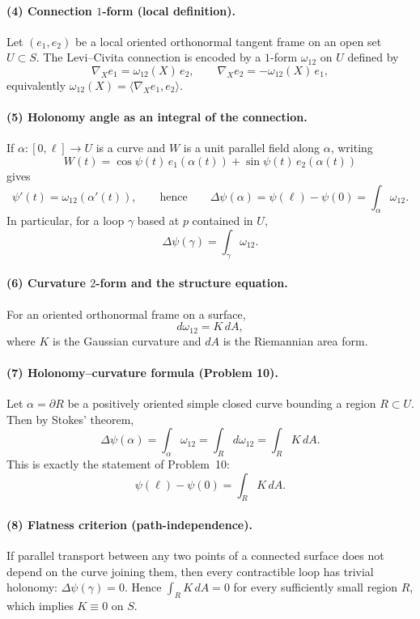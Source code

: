 \documentclass[12pt,a4paper]{article}
\theoremstyle{plain}
\theoremstyle{definition}      %
\begin{document}
	\paragraph{(4) Connection $1$-form (local definition).}
	Let $(e_1,e_2)$ be a local oriented orthonormal tangent frame on an open set $U\subset S$.
	The Levi--Civita connection is encoded by a $1$-form $\omega_{12}$ on $U$ defined by
	\[
	\nabla_X e_1=\omega_{12}(X)\,e_2,\qquad \nabla_X e_2=-\omega_{12}(X)\,e_1,
	\]
	equivalently $\omega_{12}(X)=\langle\nabla_X e_1,e_2\rangle$.
	
	\paragraph{(5) Holonomy angle as an integral of the connection.}
	If $\alpha:[0,\ell]\to U$ is a curve and $W$ is a unit parallel field along $\alpha$, writing
	\[
	W(t)=\cos\psi(t)\,e_1(\alpha(t))+\sin\psi(t)\,e_2(\alpha(t))
	\]
	gives
	\[
	\psi'(t)=\omega_{12}(\alpha'(t)),
	\qquad\text{hence}\qquad
	\Delta\psi(\alpha)=\psi(\ell)-\psi(0)=\int_\alpha \omega_{12}.
	\]
	In particular, for a loop $\gamma$ based at $p$ contained in $U$,
	\[
	\Delta\psi(\gamma)=\int_\gamma \omega_{12}.
	\]
	
	\paragraph{(6) Curvature $2$-form and the structure equation.}
	For an oriented orthonormal frame on a surface,
	\[
	d\omega_{12}=K\,dA,
	\]
	where $K$ is the Gaussian curvature and $dA$ is the Riemannian area form.
	
	\paragraph{(7) Holonomy--curvature formula (Problem 10).}
	Let $\alpha=\partial R$ be a positively oriented simple closed curve bounding a region $R\subset U$.
	Then by Stokes' theorem,
	\[
	\Delta\psi(\alpha)=\int_\alpha \omega_{12}
	=\int_R d\omega_{12}
	=\int_R K\,dA.
	\]
	This is exactly the statement of Problem~10:
	\[
	\psi(\ell)-\psi(0)=\int_R K\,dA.
	\]
	
	\paragraph{(8) Flatness criterion (path-independence).}
	If parallel transport between any two points of a connected surface does not depend on the curve joining them, then
	every contractible loop has trivial holonomy: $\Delta\psi(\gamma)=0$.
	Hence $\int_R K\,dA=0$ for every sufficiently small region $R$, which implies $K\equiv 0$ on $S$.
	
\end{document}
